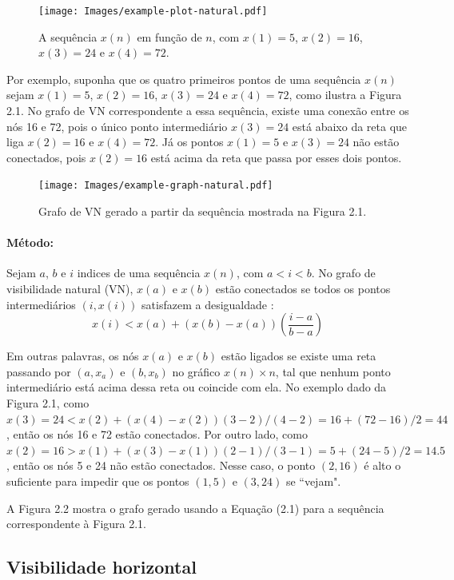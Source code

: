 \documentclass[12pt,a4paper,fleqn]{report}
\begin{document}
\begin{figure}[h]
    \centering
    \texttt{[image: Images/example-plot-natural.pdf]}
    \caption{A sequência $x(n)$ em função de $n$, com $x(1)=5$, $x(2)=16$, $x(3)=24$ e
$x(4)=72$.}
\end{figure}

Por exemplo, suponha que os quatro primeiros
pontos de uma sequência $x(n)$ sejam $x(1)=5$, $x(2)=16$, $x(3)=24$ e
$x(4)=72$, como ilustra a 
Figura 2.1. No grafo de VN correspondente a essa sequência, existe uma conexão entre os nós 16 e 72, pois 
o único ponto intermediário $x(3)=24$ está abaixo da reta que liga 
$x(2)=16$ e
$x(4)=72$. Já os pontos $x(1)=5$ e $x(3)=24$ não estão conectados, pois  $x(2)=16$ está acima da reta que passa por esses dois pontos.


\begin{figure}[h]
    \centering
    \texttt{[image: Images/example-graph-natural.pdf]}
    \caption{Grafo de VN gerado a partir da sequência mostrada na Figura 2.1.}
\end{figure}

\paragraph*{Método:} Sejam $a$, $b$ e $i$ indices de uma sequência
$x(n)$, com  $a < i < b$. No grafo de visibilidade
natural (VN), $x(a)$ e $x(b)$ estão conectados se todos os pontos
intermediários $(i, x(i))$  satisfazem a desigualdade \cite{a14}:
\begin{equation}
\label{nv}
x(i) < x(a) + \left( x(b)-x(a) \right) \left(
\frac{i - a}{b-a} \right)
\end{equation}

\noindent
Em outras palavras,  os nós $x(a)$ e $x(b)$ estão ligados se existe uma reta
passando por $(a,x_a)$ e $(b,x_b)$ no gráfico $x(n) \times n$, tal que nenhum ponto
intermediário está acima dessa reta ou coincide com ela.
No exemplo dado da Figura 2.1, como
$x(3)= 24 < x(2) + (x(4)-x(2)) (3-2)/(4-2)= 16 + (72-16)/2 = 44$, então os nós 16 e 72 estão conectados. Por outro lado, como
$x(2)=16 > x(1) +
(x(3)-x(1))(2-1)/(3-1) = 5 + (24-5)/2 = 14.5$, então os nós 5 e 24 não estão conectados. Nesse caso, o ponto $(2,16)$
é alto o suficiente para impedir que os pontos $(1,5)$ e $(3,24)$
se ``vejam".

A Figura 2.2 mostra o grafo gerado usando a Equação (2.1) para a sequência correspondente à Figura 2.1.


\subsection{Visibilidade horizontal}
\end{document}
